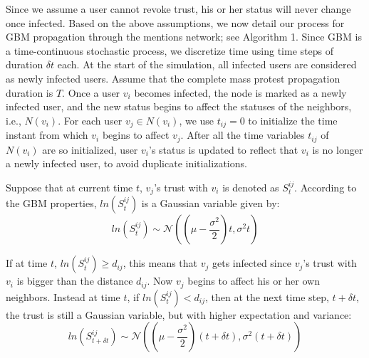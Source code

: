 Since we assume a user cannot revoke trust, his or her status will never change once infected. Based on the above assumptions, we now detail our process for GBM propagation through the mentions network; see Algorithm 1. Since GBM is a time-continuous stochastic process, we discretize
time using time steps of duration $\delta t$ each.
At the start of the simulation, all infected users are considered as newly infected users.
Assume that
the complete mass protest propagation duration is $T$. Once a user $v_i$ becomes infected, the node is marked as a newly infected user, and the
new status begins to affect the statuses of the neighbors, i.e., $N(v_i)$. For each user $v_j \in N(v_i)$, we use $t_{ij}=0$ to initialize the time
instant from which $v_i$ begins to affect $v_j$.
After all the time variables $t_{ij}$ of $N(v_i)$
are so initialized,
user $v_i$'s status is updated to reflect that $v_i$ is no longer
a newly infected user,
to avoid duplicate initializations.


Suppose that at current time $t$, $v_j$'s trust with $v_i$ is denoted as $S_{t}^{ij}$. According to the GBM properties, $ln(S_{t}^{ij})$ is a Gaussian variable given by:
\vspace{-0.5em}
\begin{equation}
ln(S_{t}^{ij})\sim \mathcal{N}((\mu - \frac{\sigma^2}{2})t, \sigma ^{2}t)
\end{equation}

If at time $t$, $ln(S_{t}^{ij})\geq d_{ij}$, this means that $v_j$ gets infected since $v_j$'s trust with $v_i$ is bigger than the distance $d_{ij}$. Now $v_j$ begins to affect his or her own neighbors. Instead at
time $t$, if $ln(S_{t}^{ij})< d_{ij}$, then at the next time step, $t+\delta t$, the  trust is still a Gaussian variable, but with higher expectation and variance: \begin{equation}
ln(S_{t+\delta t}^{ij})\sim \mathcal{N}((\mu - \frac{\sigma^2}{2})(t+\delta t), \sigma ^{2}(t+\delta t))
\end{equation}




